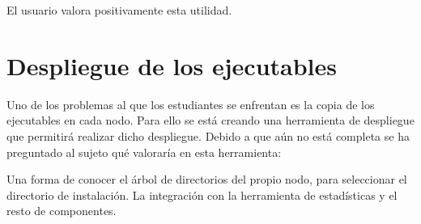 El usuario valora positivamente esta utilidad.

\section{Despliegue de los ejecutables}

Uno de los problemas al que los estudiantes se enfrentan es la copia de los ejecutables en cada nodo. Para ello se está creando una herramienta de despliegue que permitirá realizar dicho despliegue. Debido a que aún no está completa se ha preguntado al sujeto qué valoraría en esta herramienta:

Una forma de conocer el árbol de directorios del propio nodo, para seleccionar el directorio de instalación.
La integración con la herramienta de estadísticas y el resto de componentes.


